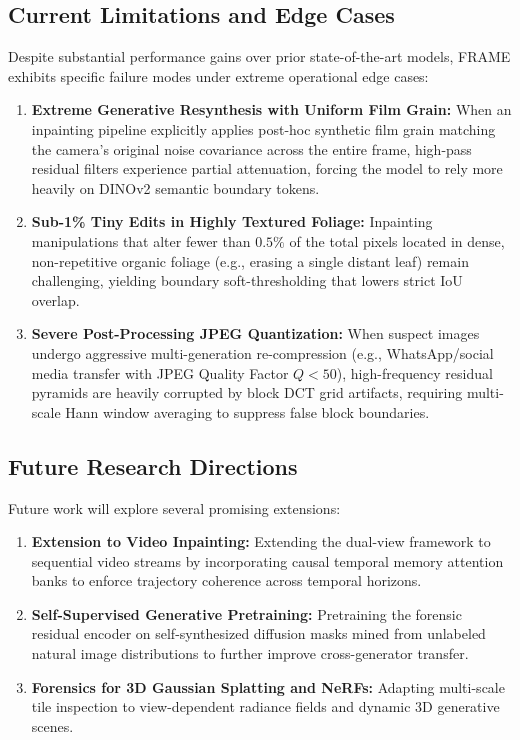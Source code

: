 \subsection{Current Limitations and Edge Cases}
Despite substantial performance gains over prior state-of-the-art models, FRAME exhibits specific failure modes under extreme operational edge cases:
\begin{enumerate}
    \item \textbf{Extreme Generative Resynthesis with Uniform Film Grain:} When an inpainting pipeline explicitly applies post-hoc synthetic film grain matching the camera's original noise covariance across the entire frame, high-pass residual filters experience partial attenuation, forcing the model to rely more heavily on DINOv2 semantic boundary tokens.
    \item \textbf{Sub-1\% Tiny Edits in Highly Textured Foliage:} Inpainting manipulations that alter fewer than $0.5\%$ of the total pixels located in dense, non-repetitive organic foliage (e.g., erasing a single distant leaf) remain challenging, yielding boundary soft-thresholding that lowers strict IoU overlap.
    \item \textbf{Severe Post-Processing JPEG Quantization:} When suspect images undergo aggressive multi-generation re-compression (e.g., WhatsApp/social media transfer with JPEG Quality Factor $Q < 50$), high-frequency residual pyramids are heavily corrupted by block DCT grid artifacts, requiring multi-scale Hann window averaging to suppress false block boundaries.
\end{enumerate}

\subsection{Future Research Directions}
Future work will explore several promising extensions:
\begin{enumerate}
    \item \textbf{Extension to Video Inpainting:} Extending the dual-view framework to sequential video streams by incorporating causal temporal memory attention banks to enforce trajectory coherence across temporal horizons.
    \item \textbf{Self-Supervised Generative Pretraining:} Pretraining the forensic residual encoder on self-synthesized diffusion masks mined from unlabeled natural image distributions to further improve cross-generator transfer.
    \item \textbf{Forensics for 3D Gaussian Splatting and NeRFs:} Adapting multi-scale tile inspection to view-dependent radiance fields and dynamic 3D generative scenes.
\end{enumerate}

